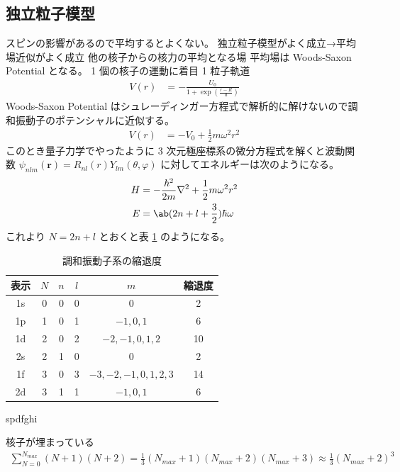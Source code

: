 \documentclass[uplatex,dvipdfmx,a4paper,11pt]{jlreq}
\newcommand{\rr}{\bm{r}}
\numberwithin{equation}{section}
\theoremstyle{definition}
\begin{document}
\subsection{独立粒子模型}
スピンの影響があるので平均するとよくない。
独立粒子模型がよく成立→平均場近似がよく成立
他の核子からの核力の平均となる場 平均場は Woods-Saxon Potential となる。
1 個の核子の運動に着目 1 粒子軌道
\begin{align}
  V(r) & = -\frac{U_0}{1 + \exp(\frac{r - R}{a})}
\end{align}
Woods-Saxon Potential はシュレーディンガー方程式で解析的に解けないので調和振動子のポテンシャルに近似する。
\begin{align}
  V(r) & = -V_0 + \frac{1}{2}m\omega^2r^2
\end{align}
このとき量子力学でやったように 3 次元極座標系の微分方程式を解くと波動関数 $\psi_{nlm}(\rr) = R_{nl}(r)Y_{lm}(\theta, \varphi)$ に対してエネルギーは次のようになる。
\begin{align}
  H & = -\frac{\hbar^2}{2m}\nabla^2 + \frac{1}{2}m\omega^2r^2 \\
  E & = \ab(2n + l + \frac{3}{2})\hbar\omega
\end{align}
これより $N = 2n + l$ とおくと表 \ref{table:oscillator} のようになる。
\begin{table}[hbtp]
  \centering
  \begin{tabular}{|c|c|c|c|c|c|}
    \hline
    表示 & $N$ & $n$ & $l$ & $m$                & 縮退度 \\
    \hline \hline
    1s & 0   & 0   & 0   & 0                  & 2   \\
    1p & 1   & 0   & 1   & $-1,0,1$           & 6   \\
    1d & 2   & 0   & 2   & $-2,-1,0,1,2$      & 10  \\
    2s & 2   & 1   & 0   & 0                  & 2   \\
    1f & 3   & 0   & 3   & $-3,-2,-1,0,1,2,3$ & 14  \\
    2d & 3   & 1   & 1   & $-1,0,1$           & 6   \\
    \hline
  \end{tabular}
  \caption{調和振動子系の縮退度}
  \label{table:oscillator}
\end{table}
spdfghi

核子が埋まっている
\begin{align}
  \sum_{N = 0}^{N_{max}}(N + 1)(N + 2) = \frac{1}{3}(N_{max} + 1)(N_{max} + 2)(N_{max} + 3) \approx \frac{1}{3}(N_{max} + 2)^3
\end{align}
\end{document}
